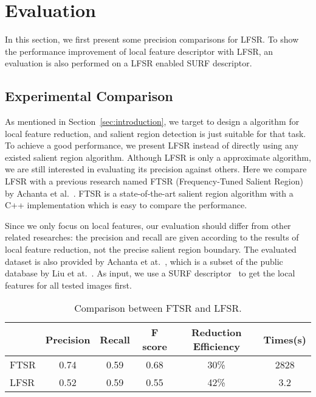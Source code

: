 \section{Evaluation}
\label{sec:evaluation}

In this section, we first present some precision comparisons for LFSR. To show the performance improvement of local feature descriptor with LFSR, an evaluation is also performed on a LFSR enabled SURF descriptor.

\subsection{Experimental Comparison}
\label{sec:evaluation_comparison}

As mentioned in Section~\ref{sec:introduction}, we target to design a algorithm for local feature reduction, and salient region detection is just suitable for that task. To achieve a good performance, we present LFSR instead of directly using any existed salient region algorithm. Although LFSR is only a approximate algorithm, we are still interested in evaluating its precision against others. Here we compare LFSR with a previous research named FTSR (Frequency-Tuned Salient Region) by Achanta et al.~\cite{achanta2009frequency}. FTSR is a state-of-the-art salient region algorithm with a C++ implementation which is easy to compare the performance.

Since we only focus on local features, our evaluation should differ from other related researches: the precision and recall are given according to the results of local feature reduction, not the precise salient region boundary. The evaluated dataset is also provided by Achanta et at.~\cite{achanta2009frequency}, which is a subset of the public database by Liu et at.~\cite{liu2011learning}. As input, we use a SURF descriptor~\cite{evans2010opensurf} to get the local features for all tested images first. 

\begin{table}
\label{tab:comparison}
\begin{center}
\begin{tabular}{|l|c|c|c|c|c|}
\hline
 & Precision & Recall & F score & Reduction Efficiency & Times(s)\\
\hline\hline
FTSR & 0.74 & 0.59 & 0.68 & 30\% & 2828\\
LFSR & 0.52 & 0.59 & 0.55 & 42\% & 3.2\\
\hline
\end{tabular}
\end{center}
\caption{Comparison between FTSR and LFSR.}
\end{table}


